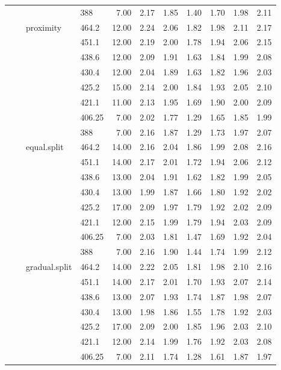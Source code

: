 \begin{longtable}{llllrrrrrrr}
   &  &  & 388 & 7.00 & 2.17 & 1.85 & 1.40 & 1.70 & 1.98 & 2.11 \\ 
   &  & proximity & 464.2 & 12.00 & 2.24 & 2.06 & 1.82 & 1.98 & 2.11 & 2.17 \\ 
   &  &  & 451.1 & 12.00 & 2.19 & 2.00 & 1.78 & 1.94 & 2.06 & 2.15 \\ 
   &  &  & 438.6 & 12.00 & 2.09 & 1.91 & 1.63 & 1.84 & 1.99 & 2.08 \\ 
   &  &  & 430.4 & 12.00 & 2.04 & 1.89 & 1.63 & 1.82 & 1.96 & 2.03 \\ 
   &  &  & 425.2 & 15.00 & 2.14 & 2.00 & 1.84 & 1.93 & 2.05 & 2.10 \\ 
   &  &  & 421.1 & 11.00 & 2.13 & 1.95 & 1.69 & 1.90 & 2.00 & 2.09 \\ 
   &  &  & 406.25 & 7.00 & 2.02 & 1.77 & 1.29 & 1.65 & 1.85 & 1.99 \\ 
   &  &  & 388 & 7.00 & 2.16 & 1.87 & 1.29 & 1.73 & 1.97 & 2.07 \\ 
   &  & equal.split & 464.2 & 14.00 & 2.16 & 2.04 & 1.86 & 1.99 & 2.08 & 2.16 \\ 
   &  &  & 451.1 & 14.00 & 2.17 & 2.01 & 1.72 & 1.94 & 2.06 & 2.12 \\ 
   &  &  & 438.6 & 13.00 & 2.04 & 1.91 & 1.62 & 1.82 & 1.99 & 2.05 \\ 
   &  &  & 430.4 & 13.00 & 1.99 & 1.87 & 1.66 & 1.80 & 1.92 & 2.02 \\ 
   &  &  & 425.2 & 17.00 & 2.09 & 1.97 & 1.79 & 1.92 & 2.02 & 2.09 \\ 
   &  &  & 421.1 & 12.00 & 2.15 & 1.99 & 1.79 & 1.94 & 2.03 & 2.09 \\ 
   &  &  & 406.25 & 7.00 & 2.03 & 1.81 & 1.47 & 1.69 & 1.92 & 2.04 \\ 
   &  &  & 388 & 7.00 & 2.16 & 1.90 & 1.44 & 1.74 & 1.99 & 2.12 \\ 
   &  & gradual.split & 464.2 & 14.00 & 2.22 & 2.05 & 1.81 & 1.98 & 2.10 & 2.16 \\ 
   &  &  & 451.1 & 14.00 & 2.17 & 2.01 & 1.70 & 1.93 & 2.07 & 2.14 \\ 
   &  &  & 438.6 & 13.00 & 2.07 & 1.93 & 1.74 & 1.87 & 1.98 & 2.07 \\ 
   &  &  & 430.4 & 13.00 & 1.98 & 1.86 & 1.55 & 1.78 & 1.92 & 2.03 \\ 
   &  &  & 425.2 & 17.00 & 2.09 & 2.00 & 1.85 & 1.96 & 2.03 & 2.10 \\ 
   &  &  & 421.1 & 12.00 & 2.14 & 1.99 & 1.76 & 1.92 & 2.03 & 2.08 \\ 
   &  &  & 406.25 & 7.00 & 2.11 & 1.74 & 1.28 & 1.61 & 1.87 & 1.97 \\ 

\end{longtable}

